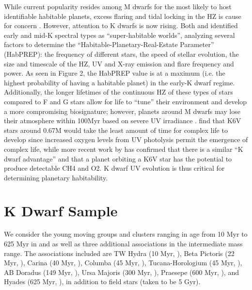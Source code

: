 \documentclass[twocolumn]{aastex62}
\begin{document}
While current popularity resides among M dwarfs for the most likely to host identifiable habitable planets, excess flaring and tidal locking in the HZ is cause for concern \citep[e.g.][]{Shields2016}. However, attention to K dwarfs is now rising. Both \citet{Heller2014} and \citet{Cuntz2016} identified early and mid-K spectral types as “super-habitable worlds”, analyzing several factors to determine the “Habitable-Planetary-Real-Estate Parameter” (HabPREP): the frequency of different stars, the speed of stellar evolution, the size and timescale of the HZ, UV and X-ray emission and flare frequency and power. As seen in Figure 2, the HabPREP value is at a maximum (i.e. the highest probability of having a habitable planet) in the early-K dwarf regime. Additionally, the longer lifetimes of the continuous HZ of these types of stars compared to F and G stars allow for life to “tune” their environment and develop a more compromising biosignature; however, planets around M dwarfs may lose their atmosphere within 100Myr based on severe UV irradiance \citep{Airapetian2017}. \citet{Lingam2017} find that K6V stars around 0.67M  would take the least amount of time for complex life to develop since increased oxygen levels from UV photolysis permit the emergence of complex life, while more recent work by \citet{Arney2017}
has confirmed that there is a similar “K dwarf advantage” and that a planet orbiting a K6V star has the potential to produce detectable CH4 and O2. K dwarf UV evolution is thus critical for determining planetary habitability.



\section{K Dwarf Sample}\label{sec:sample}

We consider the young moving groups and clusters ranging in age from 10 Myr to 625 Myr in \citet{Shkolnik2014} and \citet{Schneider2018} as well as three additional associations in the intermediate mass range. The associations included are TW Hydra (10 Myr, \citealt{Bell2015}), Beta Pictoris (22 Myr, \citealt{Shkolnik2017}), Carina (40 Myr, \citealt{Torres2008}), Columba (45 Myr, \citealt{Zuckerman2011}), Tucana-Horologium (45 Myr, \citealt{Bell2015}), AB Doradus (149 Myr, \citealt{Bell2015}), Ursa Majoris (300 Myr, \citealt{King2005}), Praesepe (600 Myr, \citealt{Kraus2007}), and Hyades (625 Myr, \citealt{Perryman1997}), in addition to field stars (taken to be 5 Gyr).
\end{document}
